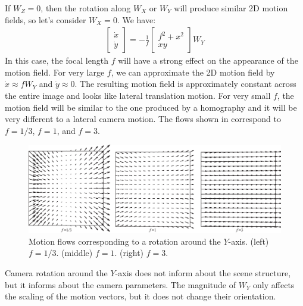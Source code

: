 If $W_Z=0$, then the rotation along $W_X$ or $W_Y$ will produce similar 2D motion fields, so let's consider $W_X=0$. We have:
\begin{align}
    \begin{bmatrix}
        \dot{x} \\
        \dot{y}
    \end{bmatrix}
    =
    -\frac{1}{f}
    \begin{bmatrix}
        f^2+x^2 \\
        xy
    \end{bmatrix}
    W_Y
\end{align}
In this case, the focal length $f$ will have a strong effect on the appearance of the motion field. For very large $f$, we can approximate the 2D motion field by $\dot{x} \approx f W_Y$ and $\dot{y} \approx 0$. The resulting motion field is approximately constant across the entire image and looks like lateral translation motion. For very small $f$, the motion field will be similar to the one produced by a homography and it will be very different to a lateral camera motion. The flows shown in \fig{\ref{fig:motion_wy_f03_f1_f3}} correspond to $f=1/3$, $f=1$, and $f=3$.


\begin{figure}[h!]
    \centerline{
        \includegraphics[width=1\linewidth]{figures/optical_flow/camera_motion_field_rotation_three_f.eps}
    }
    \caption{Motion flows corresponding to a rotation around the
        $Y$-axis. (left) $f = 1/3$. (middle) $f = 1$.
        (right) $f = 3$.}
    \label{fig:motion_wy_f03_f1_f3}
\end{figure}

Camera rotation around the $Y$-axis does not inform about the scene structure, but it informs about the camera parameters. The magnitude of $W_Y$ only affects the scaling of the motion vectors, but it does not change their orientation.

